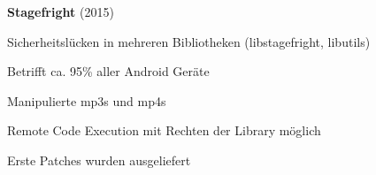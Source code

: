 \begin{frame}
	\textbf{Stagefright} (2015)
	\begin{block}{}
		Sicherheitslücken in mehreren Bibliotheken (libstagefright, libutils)
	\end{block}		
	\begin{block}{}
		Betrifft ca. 95\% aller Android Geräte
	\end{block}
	\begin{block}{}
		Manipulierte mp3s und mp4s
	\end{block}
	\begin{block}{}
		Remote Code Execution mit Rechten der Library möglich						
	\end{block}
	\begin{block}{}
		Erste Patches wurden ausgeliefert
	\end{block}
\end{frame}